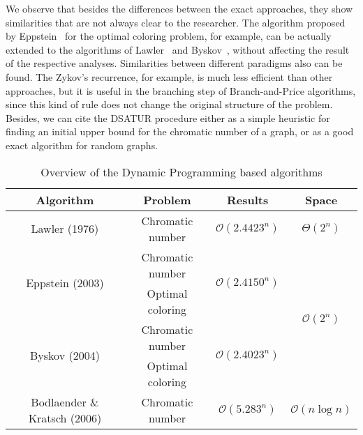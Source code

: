 \documentclass[fleqn,10pt]{SelfArx} %
\newcommand{\cO}{\mathcal{O}}
\begin{document}
	
	We observe that besides the differences between the exact approaches, they show similarities that are not always
	clear to the researcher. The algorithm proposed by Eppstein~\cite{Eppstein03} for the optimal coloring problem, for example, can be actually extended to the algorithms of Lawler~\cite{Lawler76} and Byskov~\cite{Byskov03}, without affecting the result of the respective analyses. Similarities between different paradigms also can be found. The Zykov's recurrence, for example, is much
	less efficient than other approaches, but it is useful in the
	branching step of Branch-and-Price algorithms, since this kind of rule does not change the original structure of the problem. Besides, we can cite the \textsf{DSATUR} procedure either as a simple heuristic for finding an initial upper bound for the chromatic number of a graph, or as a good exact algorithm for random graphs.
	
	
	\begin{table}[!h]
		\centering
				\caption{\label{tab:conc} Overview of the Dynamic Programming based algorithms}
		\begin{adjustbox}{width=\columnwidth}
		\begin{tabular}{|c|c|c|c|}
			\toprule
			\small
			\textbf{Algorithm}               & \textbf{Problem} & \textbf{Results}                      & \textbf{Space}                     \\ \midrule
			Lawler (1976)                    & Chromatic number  & $\cO(2.4423^n)$                  & $\Theta(2^n)$                       \\ \midrule
			\multirow{2}{*}{Eppstein (2003)} & Chromatic number  & \multirow{2}{*}{$\cO(2.4150^n)$} & \multirow{4}{*}{$\cO(2^n)$} \\ \cline{2-2}
			& Optimal coloring   &                                          &                                     \\ \cline{1-3}
			\multirow{2}{*}{Byskov (2004)}   & Chromatic number  & \multirow{2}{*}{$\cO(2.4023^n)$} &                                     \\ \cline{2-2}
			& Optimal coloring   &                                          &                                     \\ \midrule
			Bodlaender \& Kratsch (2006)     & Chromatic number  & $\cO(5.283^n)$                   & $\cO(n \log n)$             \\ \bottomrule
		\end{tabular}
		\end{adjustbox}
		
	\end{table}
	
\end{document}
